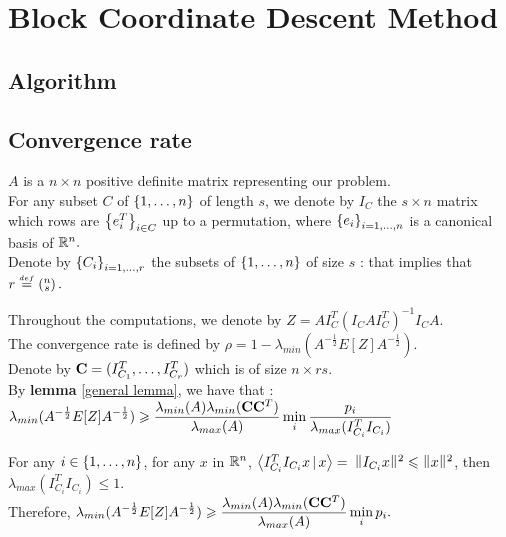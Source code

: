 \chapter{Block Coordinate Descent Method} \label{newton}




\section{Algorithm}

\section{Convergence rate}

$A$ is a $n \times n$ positive definite matrix representing our problem.\\ 
For any subset $C$ of $\left\{1,\dots,n\right\}$ of length $s$, we denote by $I_{C}$ the $s\times n$ matrix which rows are $\left\{e_{i}^{T}\right\}_{i\in C}$ up to a permutation, where $\left\{e_{i}\right\}_{i=1,\dots,n}$ is a canonical basis of ${\mathbb R}^{n}.$\\ 
Denote by $\left\{C_{i}\right\}_{i=1,\dots,r}$ the subsets of $\left\{1,\dots,n\right\}$ of size $s$ : that implies that $\displaystyle r \stackrel{{\scriptscriptstyle{def}}}{=}  \left(\substack{n \\ s}\right).$
 
Throughout the computations, we denote by $Z = A I_{C}^{T} (I_{C} A I_{C}^{T})^{-1} I_{C} A$.\\

The convergence rate is defined by $\rho = 1 - \lambda_{min}(A^{-\frac12}E[Z]A^{-\frac12}  )$.\\


Denote by $\bold{C} = (I_{C_{1}}^{T},\dots,I_{C_{r}}^{T})$ which is of size $ n \times r s$.\\
 
 By \textbf{lemma} \ref{general lemma}, we have that : 
$\displaystyle \lambda_{min}(A^{-\frac12}E[Z]A^{-\frac12} )  \geqslant  \displaystyle  \frac{\lambda_{min}(A) \lambda_{min}(\bold{C} \bold{C}^{T} )}{ \lambda_{max}(A)} \min_{i} \frac{p_{i}}{\lambda_{max}(I_{C_{i}}^{T} I_{C_{i}})} $
 
For any $i\in \left\{1,\dots,n\right\}$, for any $x$ in ${\mathbb R}^{n}$,
$\left<I_{C_{i}}^{T} I_{C_{i}} x \,|\,x\right> =$
$ \norm{ I_{C_{i}}x }^{2} \leq \norm{x}^{2}$, then $\lambda_{max}( I_{C_{i}}^{T} I_{C_{i}}  ) \leq 1$.\\
 
 Therefore, 
$\displaystyle \lambda_{min}(A^{-\frac12}E[Z]A^{-\frac12} ) \geqslant \frac{ \lambda_{min}(A) \lambda_{min}(\bold{C} \bold{C}^{T} )}{\lambda_{max}(A)}  \min_{i} p_{i}.$\\

